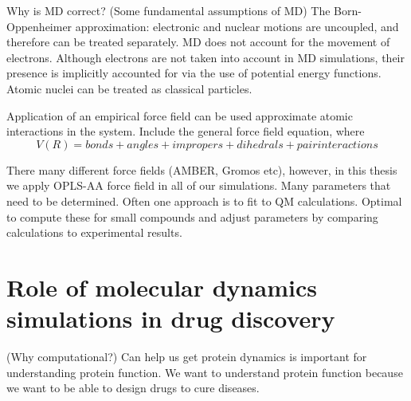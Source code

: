 
\1 Why is MD correct? (Some fundamental assumptions of MD)
  \2 The Born-Oppenheimer approximation: electronic and nuclear motions are uncoupled, and therefore can be treated separately. MD does not account for the movement of electrons. Although electrons are not taken into account in MD simulations, their presence is implicitly accounted for via the use of potential energy functions.  Atomic nuclei can be treated as classical particles.



  \2 Application of an empirical force field can be used approximate atomic interactions in the system.
      \3 Include the general force field equation, where
      \[ V(R) = bonds + angles + impropers + dihedrals + pair interactions \]

      \3 There many different force fields (AMBER, Gromos etc), however, in this thesis we apply OPLS-AA force field in all of our simulations.
        \4 Many parameters that need to be determined. Often one approach is to fit to QM calculations.  Optimal to compute these for small compounds and adjust parameters by comparing calculations to experimental results.



\section{Role of molecular dynamics simulations in drug discovery}
\1 (Why computational?) Can help us get protein dynamics is important for understanding protein function. We want to understand protein function because we want to be able to design drugs to cure diseases.

